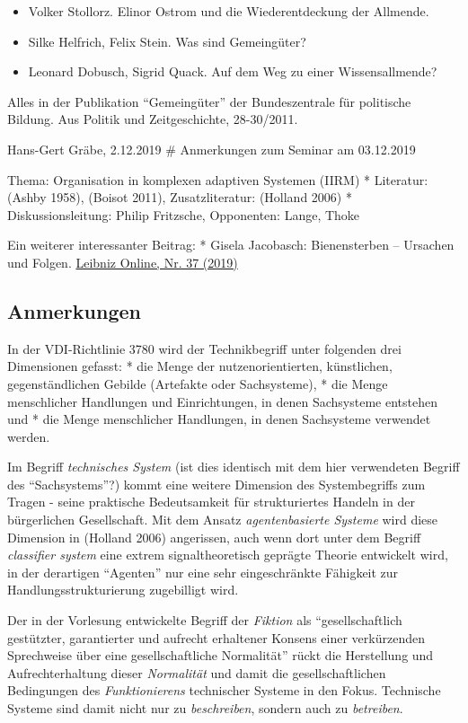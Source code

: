 \documentclass[11pt,a4paper]{article}
\begin{document}
\begin{itemize}
[noitemsep]
\item
  Volker Stollorz. Elinor Ostrom und die Wiederentdeckung der Allmende.
\item
  Silke Helfrich, Felix Stein. Was sind Gemeingüter?
\item
  Leonard Dobusch, Sigrid Quack. Auf dem Weg zu einer Wissensallmende?
\end{itemize}

Alles in der Publikation ``Gemeingüter'' der Bundeszentrale für
politische Bildung. Aus Politik und Zeitgeschichte, 28-30/2011.

Hans-Gert Gräbe, 2.12.2019 \# Anmerkungen zum Seminar am 03.12.2019

Thema: Organisation in komplexen adaptiven Systemen (IIRM) * Literatur:
(Ashby 1958), (Boisot 2011), Zusatzliteratur: (Holland 2006) *
Diskussionsleitung: Philip Fritzsche, Opponenten: Lange, Thoke

Ein weiterer interessanter Beitrag: * Gisela Jacobasch: Bienensterben --
Ursachen und Folgen.
\href{https://leibnizsozietaet.de/internetzeitschrift-leibniz-online-nr-37-2019/}{Leibniz
Online, Nr. 37 (2019)}

\hypertarget{anmerkungen-1}{%
\subsection{Anmerkungen}\label{anmerkungen-1}}

In der VDI-Richtlinie 3780 wird der Technikbegriff unter folgenden drei
Dimensionen gefasst: * die Menge der nutzenorientierten, künstlichen,
gegenständlichen Gebilde (Artefakte oder Sachsysteme), * die Menge
menschlicher Handlungen und Einrichtungen, in denen Sachsysteme
entstehen und * die Menge menschlicher Handlungen, in denen Sachsysteme
verwendet werden.

Im Begriff \emph{technisches System} (ist dies identisch mit dem hier
verwendeten Begriff des ``Sachsystems''?) kommt eine weitere Dimension
des Systembegriffs zum Tragen - seine praktische Bedeutsamkeit für
strukturiertes Handeln in der bürgerlichen Gesellschaft. Mit dem Ansatz
\emph{agentenbasierte Systeme} wird diese Dimension in (Holland 2006)
angerissen, auch wenn dort unter dem Begriff \emph{classifier system}
eine extrem signaltheoretisch geprägte Theorie entwickelt wird, in der
derartigen ``Agenten'' nur eine sehr eingeschränkte Fähigkeit zur
Handlungsstrukturierung zugebilligt wird.

Der in der Vorlesung entwickelte Begriff der \emph{Fiktion} als
``gesellschaftlich gestützter, garantierter und aufrecht erhaltener
Konsens einer verkürzenden Sprechweise über eine gesellschaftliche
Normalität'' rückt die Herstellung und Aufrechterhaltung dieser
\emph{Normalität} und damit die gesellschaftlichen Bedingungen des
\emph{Funktionierens} technischer Systeme in den Fokus. Technische
Systeme sind damit nicht nur zu \emph{beschreiben}, sondern auch zu
\emph{betreiben}.
\end{document}
